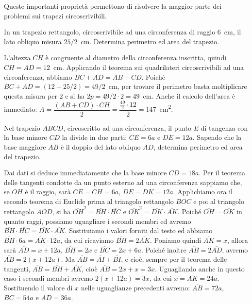 Queste importanti proprietà permettono di risolvere la maggior parte dei problemi sui trapezi circoscrivibili.

\begin{exrig}
\begin{esempio}
In un trapezio rettangolo, circoscrivibile ad una circonferenza di raggio 6~cm, il lato obliquo misura $25/2$~cm. Determina perimetro ed area del trapezio.\vspace{7pt}

L'altezza $CH$ è congruente al diametro della circonferenza inscritta, quindi $CH = AD = 12$~cm.
Applicando il teorema sui quadrilateri circoscrivibili ad una circonferenza, abbiamo $BC + AD = AB + CD$.
Poiché $BC + AD = (12 + 25/2) = 49/2$~cm, per trovare il perimetro basta moltiplicare questa misura per 2 e si ha $2p=49/2 \cdot 2=49$~cm.
Anche il calcolo dell'area è immediato: $A=\dfrac{(AB+CD)\cdot CH}{2}=\dfrac{\frac{49}{2}\cdot 12}{2}=147$~cm\textsuperscript{2}. 
\end{esempio}

\begin{esempio}
Nel trapezio $ABCD$, circoscritto ad una circonferenza, il punto $E$ di tangenza con la base minore $CD$ la divide in due parti: $CE = 6a$ e $DE = 12a$. Sapendo che la base maggiore $AB$ è il doppio del lato obliquo $AD$, determina perimetro ed area del trapezio.\vspace{7pt}

Dai dati si deduce immediatamente che la base minore $CD = 18a$.
Per il teorema delle tangenti condotte da un punto esterno ad una circonferenza sappiamo che, se $OH$ è il raggio, sarà $CE=CH=6a$, $DE=DK=12a$.
Applichiamo ora il secondo teorema di Euclide prima al triangolo rettangolo $BOC$ e poi al triangolo rettangolo $AOD$, si ha $\overline{OH}^2=\overline{BH}\cdot\overline{HC}$ e $\overline{OK}^2=\overline{DK}\cdot\overline{AK}$.
Poiché $\overline{OH}=\overline{OK}$ in quanto raggi, possiamo uguagliare i secondi membri ed avremo $\overline{BH}\cdot\overline{HC}=\overline{DK}\cdot\overline{AK}$. Sostituiamo i valori forniti dal testo ed abbiamo $\overline{BH}\cdot 6a=\overline{AK}\cdot 12a$, da cui ricaviamo $\overline{BH}=2\overline{AK}$. Poniamo quindi $\overline{AK} = x$, allora sarà $\overline{AD}=x+12a$, $\overline{BH}=2x$ e $\overline{BC}=2x+6a$. Poiché inoltre $\overline{AB}=2\overline{AD}$, avremo $\overline{AB} = 2(x + 12a)$. Ma $\overline{AB}=\overline{AI}+\overline{BI}$, e cioè, sempre per il teorema delle tangenti, $\overline{AB}=\overline{BH}+\overline{AK}$, cioè $\overline{AB} = 2x + x = 3x$. Uguagliando anche in questo caso i secondi membri avremo $2(x+12a)=3x$, da cui $x = \overline{AK} = 24a$. Sostituendo il valore di $x$ nelle uguaglianze precedenti avremo: $\overline{AB}=72a$, $\overline{BC}=54a$ e $\overline{AD}=36a$. 


\end{esempio}
\end{exrig}
